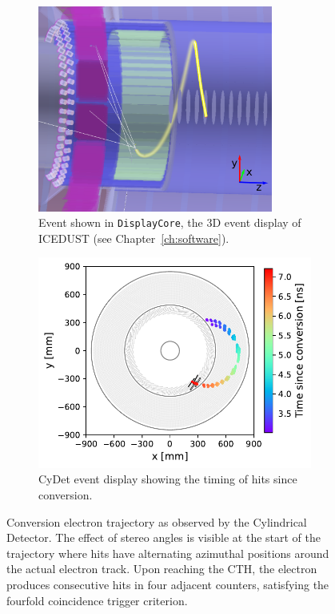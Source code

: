 \begin{figure}
    \centering
    \captionsetup[subfigure]{justification=centering}
    \begin{subfigure}[b]{0.44\textwidth}
    \centering
    \includegraphics[width=0.85\textwidth]{chapter2/signal_event_display_crop_axes.pdf}
    \vspace{1.18cm}
    \caption{Event shown in \texttt{DisplayCore}, the 3D event display of
    ICEDUST (see Chapter~\ref{ch:software}).}
    \end{subfigure}
    \hfill
    \begin{subfigure}[b]{0.55\textwidth}
    \centering
    \includegraphics[width=0.99\textwidth]{chapter2/cydet_signal_track_v4.pdf}
    \caption{CyDet event display showing the timing of hits since conversion.}
    \end{subfigure}
    
    \caption{ Conversion electron trajectory as observed by the Cylindrical
    Detector. The effect of stereo angles is visible at the start of the
    trajectory where hits have alternating azimuthal positions around the actual
    electron track. Upon reaching the CTH, the electron produces consecutive
    hits in four adjacent counters, satisfying the fourfold coincidence trigger
    criterion.}
    \label{fig:cydet_signal_event}
\end{figure}


